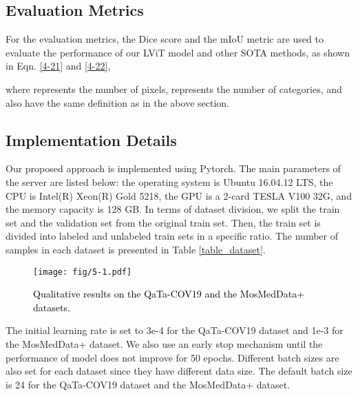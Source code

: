 \documentclass[lettersize,journal]{IEEEtran}
\begin{document}
\subsection{Evaluation Metrics}
For the evaluation metrics, the Dice score and the mIoU metric are used to evaluate the performance of our LViT model and other SOTA methods, as shown in Eqn. \ref{4-21} and \ref{4-22},

where  represents the number of pixels,  represents the number of categories,  and  also have the same definition as in the above section.
\vspace{-2mm}
\subsection{Implementation Details}
Our proposed approach is implemented using Pytorch. The main parameters of the server are listed below: the operating system is Ubuntu 16.04.12 LTS, the CPU is Intel(R) Xeon(R) Gold 5218, the GPU is a 2-card TESLA V100 32G, and the memory capacity is 128 GB. 
In terms of dataset division, we split the train set and the validation set from the original train set. Then, the train set is divided into labeled and unlabeled train sets in a specific ratio. The number of samples in each dataset is presented in Table \ref{table_dataset}.

\begin{figure*}[!ht]
\centering
  \texttt{[image: fig/5-1.pdf]}
  \caption{\textcolor{black}{Qualitative results on the QaTa-COV19 and the MosMedData+ datasets.}}
  \label{ExpToSOTA}
  \vspace{-3mm}
\end{figure*}
The initial learning rate is set to 3e-4 for the QaTa-COV19 dataset and 1e-3 for the MosMedData+ dataset. We also use an early stop mechanism until the performance of model does not improve for 50 epochs. Different batch sizes are also set for each dataset since they have different data size. The default batch size is 24 for the QaTa-COV19 dataset and the MosMedData+ dataset. 
\end{document}
